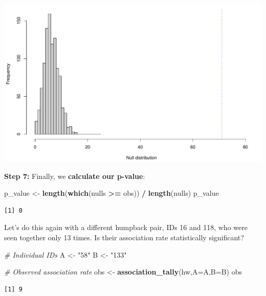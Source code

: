 \documentclass[
]{book}
\newenvironment{Shaded}{\begin{snugshade}}{\end{snugshade}}
\newcommand{\CommentTok}[1]{\textcolor[rgb]{0.56,0.35,0.01}{\textit{#1}}}
\newcommand{\DataTypeTok}[1]{\textcolor[rgb]{0.13,0.29,0.53}{#1}}
\newcommand{\KeywordTok}[1]{\textcolor[rgb]{0.13,0.29,0.53}{\textbf{#1}}}
\newcommand{\NormalTok}[1]{#1}
\newcommand{\OperatorTok}[1]{\textcolor[rgb]{0.81,0.36,0.00}{\textbf{#1}}}
\newcommand{\StringTok}[1]{\textcolor[rgb]{0.31,0.60,0.02}{#1}}
\begin{document}
\includegraphics{figures/unnamed-chunk-307-1.pdf}

\textbf{Step 7:} Finally, we \textbf{calculate our p-value}:

\begin{Shaded}
\begin{Highlighting}[]
\NormalTok{p_value <-}\StringTok{ }\KeywordTok{length}\NormalTok{(}\KeywordTok{which}\NormalTok{(nulls }\OperatorTok{>=}\StringTok{ }\NormalTok{obs)) }\OperatorTok{/}\StringTok{ }\KeywordTok{length}\NormalTok{(nulls)}
\NormalTok{p_value}
\end{Highlighting}
\end{Shaded}

\begin{verbatim}
[1] 0
\end{verbatim}

Let's do this again with a different humpback pair, IDs 16 and 118, who were seen together only 13 times. Is their association rate statistically significant?

\begin{Shaded}
\begin{Highlighting}[]
\CommentTok{# Individual IDs}
\NormalTok{A <-}\StringTok{ "58"}
\NormalTok{B <-}\StringTok{ "133"}

\CommentTok{# Observed association rate}
\NormalTok{obs <-}\StringTok{ }\KeywordTok{association_tally}\NormalTok{(hw,}\DataTypeTok{A=}\NormalTok{A,}\DataTypeTok{B=}\NormalTok{B)}
\NormalTok{obs}
\end{Highlighting}
\end{Shaded}

\begin{verbatim}
[1] 9
\end{verbatim}
\end{document}
